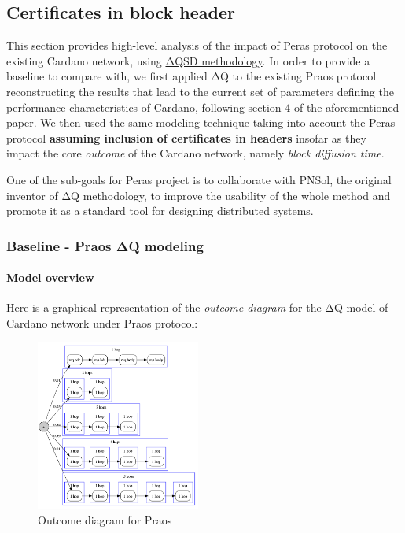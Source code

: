 \documentclass[10pt]{article}
\begin{document}
\subsection{Certificates in block
header}\label{certificates-in-block-header}

This section provides high-level analysis of the impact of Peras
protocol on the existing Cardano network, using
\href{https://iohk.io/en/research/library/papers/mind-your-outcomes-the-dqsd-paradigm-for-quality-centric-systems-development-and-its-application-to-a-blockchain-case-study/}{ΔQSD
methodology}. In order to provide a baseline to compare with, we first
applied ΔQ to the existing Praos protocol reconstructing the results
that lead to the current set of parameters defining the performance
characteristics of Cardano, following section 4 of the aforementioned
paper. We then used the same modeling technique taking into account the
Peras protocol \textbf{assuming inclusion of certificates in headers}
insofar as they impact the core \emph{outcome} of the Cardano network,
namely \emph{block diffusion time}.

\begin{quoting}
One of the sub-goals for Peras project is to collaborate
with PNSol, the original inventor of ΔQ methodology, to improve the
usability of the whole method and promote it as a standard tool for
designing distributed systems.
\end{quoting}

\subsubsection{Baseline - Praos ΔQ
modeling}\label{baseline---praos-ux3b4q-modeling}

\paragraph{Model overview}\label{model-overview}

Here is a graphical representation of the \emph{outcome diagram} for the
ΔQ model of Cardano network under Praos protocol:

\begin{figure}
\centering
\includegraphics[width=0.48\textwidth]{../diagrams/praos-delta-q.png}
\caption{Outcome diagram for Praos}
\end{figure}
\end{document}
